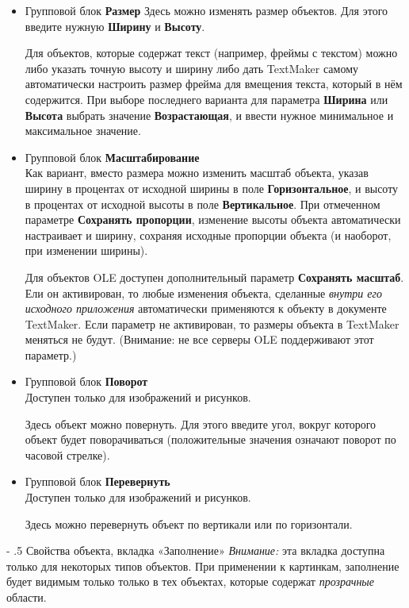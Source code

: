 ﻿\documentclass[a4paper,10pt]{article}
\makeatletter
\renewcommand\paragraph{%
   \@startsection{paragraph}{4}{0mm}%
      {-\baselineskip}%
      {.5\baselineskip}%
      {\normalfont\normalsize\bfseries}}
\makeatother
\begin{document}
\begin{itemize}
 \item Групповой блок \textbf{Размер}
 Здесь можно изменять размер объектов. Для этого введите нужную \textbf{Ширину} и \textbf{Высоту}.
  
 Для объектов, которые содержат текст (например, фреймы с текстом) можно либо указать точную высоту и ширину либо дать TextMaker самому автоматически настроить размер фрейма для вмещения текста, который в нём содержится. При выборе последнего варианта для параметра \textbf{Ширина} или \textbf{Высота} выбрать значение \textbf{Возрастающая}, и ввести нужное минимальное и максимальное значение.
 
  \item Групповой блок \textbf{Масштабирование}\\
 Как вариант, вместо размера можно изменить масштаб объекта, указав ширину в процентах от исходной ширины в поле \textbf{Горизонтальное}, и высоту в процентах от исходной высоты в поле \textbf{Вертикальное}.
 При отмеченном параметре \textbf{Сохранять пропорции}, изменение высоты объекта автоматически настраивает и ширину, сохраняя исходные пропорции объекта (и наоборот, при изменении ширины).
 
 Для объектов OLE доступен дополнительный параметр \textbf{Сохранять масштаб}. Ели он активирован, то любые изменения объекта, сделанные \textit{внутри его исходного приложения} автоматически применяются к объекту в документе TextMaker. Если параметр не активирован, то размеры объекта в TextMaker меняться не будут. (Внимание: не все серверы OLE поддерживают этот параметр.)
 \item Групповой блок \textbf{Поворот}\\
 Доступен только для изображений и рисунков.
 
 Здесь объект можно повернуть. Для этого введите угол, вокруг которого объект будет поворачиваться (положительные значения означают поворот по часовой стрелке).
 \item Групповой блок \textbf{Перевернуть}\\
 Доступен только для изображений и рисунков.
 
 Здесь можно перевернуть объект по вертикали или по горизонтали. 
 \end{itemize}
 
 \paragraph{Свойства объекта, вкладка «Заполнение»} \label{sec:свойстваобъектавклзаполнение}
 \textit{Внимание:} эта вкладка доступна только для некоторых типов объектов. При применении к картинкам, заполнение будет видимым только только в тех объектах, которые содержат \textit{прозрачные} области.
 
\end{document}
